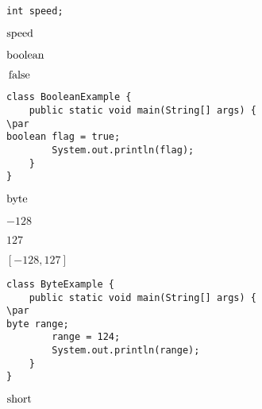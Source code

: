 \documentclass{book}
\def\lthtmlcheckvsize{\ifdim\ht\sizebox<\vsize 
  \ifdim\wd\sizebox<\hsize\expandafter\hfill\fi \expandafter\vfill
  \else\expandafter\vss\fi}%
\begin{document}
{\newpage\clearpage
{}%
\begin{lstlisting}
int speed;
\end{lstlisting}%
\lthtmlfigureZ
\lthtmlcheckvsize\clearpage}

{\newpage\clearpage
{}%
$\lstinline{speed}$%
\lthtmlindisplaymathZ
\lthtmlcheckvsize\clearpage}

{\newpage\clearpage
{}%
$\lstinline{boolean}$%
\lthtmlindisplaymathZ
\lthtmlcheckvsize\clearpage}

{\newpage\clearpage
{}%
$\lstinline{false}$%
\lthtmlindisplaymathZ
\lthtmlcheckvsize\clearpage}

{\newpage\clearpage
{}%
\begin{lstlisting}
class BooleanExample {
    public static void main(String[] args) {
\par
boolean flag = true;
        System.out.println(flag);
    }
}
\end{lstlisting}%
\lthtmlfigureZ
\lthtmlcheckvsize\clearpage}

{\newpage\clearpage
{}%
$\lstinline{byte}$%
\lthtmlindisplaymathZ
\lthtmlcheckvsize\clearpage}

{\newpage\clearpage
{}%
$-128$%
\lthtmlindisplaymathZ
\lthtmlcheckvsize\clearpage}

{\newpage\clearpage
{}%
$127$%
\lthtmlindisplaymathZ
\lthtmlcheckvsize\clearpage}

{\newpage\clearpage
{}%
$[-128, 127]$%
\lthtmlindisplaymathZ
\lthtmlcheckvsize\clearpage}

{\newpage\clearpage
{}%
\begin{lstlisting}
class ByteExample {
    public static void main(String[] args) {
\par
byte range;
        range = 124;
        System.out.println(range);
    }
}
\end{lstlisting}%
\lthtmlfigureZ
\lthtmlcheckvsize\clearpage}

{\newpage\clearpage
{}%
$\lstinline{short}$%
\lthtmlindisplaymathZ
\lthtmlcheckvsize\clearpage}
\end{document}
